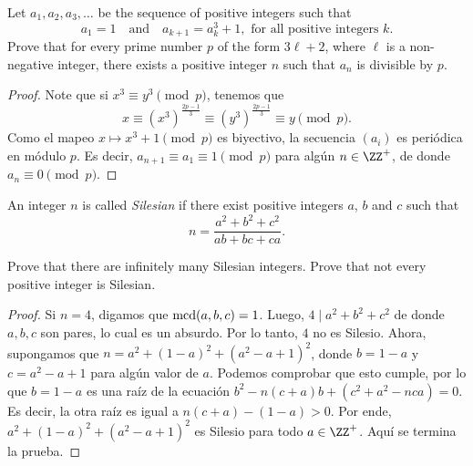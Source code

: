\begin{probEG}[MEMO 2018 T-7]
	Let $a_1,a_2,a_3,\dots$ be the sequence of positive integers such that
	\[a_1=1\quad\text{and}\quad a_{k+1}=a^3_k+1,\text{ for all positive integers }k.\]
	Prove that for every prime number $p$ of the form $3\ell+2$, where $\ell$ is a non-negative integer, there exists a positive integer $n$ such that $a_n$ is divisible by $p$.
\end{probEG}

\begin{proof}
	Note que si $x^3\equiv y^3\pmod p$, tenemos que
	\[x\equiv(x^3)^\frac{2p-1}{3}\equiv(y^3)^\frac{2p-1}{3}\equiv y\pmod p.\]
	Como el mapeo $x\mapsto x^3+1\pmod p$ es biyectivo, la secuencia $(a_i)$ es periódica en módulo $p$. Es decir, $a_{n+1}\equiv a_1\equiv 1\pmod p$ para algún $n\in\ZZ^+$, de donde $a_n\equiv 0\pmod p$.
\end{proof}

\begin{probMB}[MEMO 2018 T-8]
	An integer $n$ is called \emph{Silesian} if there exist positive integers $a$, $b$ and $c$ such that
	\[n=\frac{a^2+b^2+c^2}{ab+bc+ca}.\]
	\begin{enumerate}[(a)]
		\ii Prove that there are infinitely many Silesian integers.
		\ii Prove that not every positive integer is Silesian.
	\end{enumerate}
\end{probMB}

\begin{proof}
	Si $n=4$, digamos que $\operatorname{mcd}(a,b,c)=1$. Luego, $4\mid a^2+b^2+c^2$ de donde $a,b,c$ son pares, lo cual es un absurdo. Por lo tanto, $4$ no es Silesio. Ahora, supongamos que $n=a^2+(1-a)^2+(a^2-a+1)^2$, donde $b=1-a$ y $c=a^2-a+1$ para algún valor de $a$. Podemos comprobar que esto cumple, por lo que $b=1-a$ es una raíz de la ecuación $b^2-n(c+a)b+(c^2+a^2-nca)=0$. Es decir, la otra raíz es igual a $n(c+a)-(1-a)>0$. Por ende, $a^2+(1-a)^2+(a^2-a+1)^2$ es Silesio para todo $a\in\ZZ^+$. Aquí se termina la prueba.
\end{proof}
